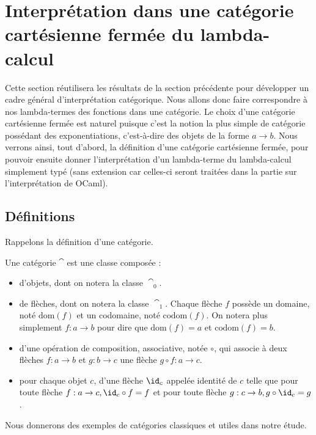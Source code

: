 \section[Interprétation catégorique]{Interprétation dans une catégorie cartésienne fermée du lambda-calcul}

Cette section réutilisera les résultats de la section précédente pour développer un cadre général d'interprétation catégorique. Nous allons donc faire correspondre à nos lambda-termes des fonctions dans une catégorie. Le choix d'une catégorie cartésienne fermée est naturel puisque c'est la notion la plus simple de catégorie possédant des exponentiations, c'est-à-dire des objets de la forme $a\to b$. Nous verrons ainsi, tout d'abord, la définition d'une catégorie cartésienne fermée, pour pouvoir ensuite donner l'interprétation d'un lambda-terme du lambda-calcul simplement typé (sans extension car celles-ci seront traitées dans la partie sur l'interprétation de OCaml).

\subsection{Définitions}

Rappelons la définition d'une catégorie.

\begin{defi}[Catégorie]\label{categorie}
    Une catégorie $\cat$ est une classe composée :
    \begin{itemize}[label=$\bullet$]
        \item d'objets, dont on notera la classe $\cat_0$.
        \item de flèches, dont on notera la classe $\cat_1$. Chaque flèche $f$ possède un domaine, noté $\mathrm{dom}(f)$ et un codomaine, noté $\mathrm{codom}(f)$. On notera plus simplement $f : a\to b$ pour dire que $\mathrm{dom}(f)=a$ et $\mathrm{codom}(f)=b$.
        \item d'une opération de composition, associative, notée $\circ$, qui associe à deux flèches $f : a\to b$ et $g : b\to c$ une flèche $g\circ f : a \to c$.
        \item pour chaque objet $c$, d'une flèche $\id_c$ appelée identité de $c$ telle que pour toute flèche $f : a \to c, \id_c\circ f = f$ et pour toute flèche $g : c \to b, g\circ \id_c = g$.
    \end{itemize}
\end{defi}

Nous donnerons des exemples de catégories classiques et utiles dans notre étude.

